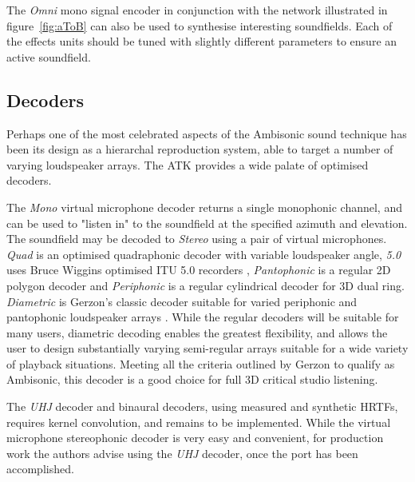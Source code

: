 \documentclass{article}
\begin{document}
The \emph{Omni} mono signal encoder in conjunction with the network illustrated in figure~\ref{fig:aToB} can also be used to synth\-esise interesting soundfields.
Each of the effects units should be tuned with slightly different parameters to ensure an active soundfield.





\subsection{Decoders}\label{sec:decoders}

Perhaps one of the most celebrated aspects of the Ambisonic sound technique has been its design as a hierarchal reproduction system, able to target a number of varying loudspeaker arrays.
The ATK provides a wide palate of optimised decoders.

The \emph{Mono} virtual microphone decoder returns a single monophonic channel, and can be used to "listen in" to the soundfield at the specified azimuth and elevation.
The soundfield may be decoded to \emph{Stereo} using a pair of virtual microphones.
\emph{Quad} is an optimised quadraphonic decoder with variable loudspeaker angle, \emph{5.0} uses Bruce Wiggins optimised ITU 5.0 recorders \cite{wiggins:2003optimised}, \emph{Pantophonic} is a regular 2D polygon decoder and \emph{Periphonic} is a regular cylindrical decoder for 3D dual ring.
\emph{Diametric} is Gerzon's classic decoder suitable for varied periphonic and pantophonic loudspeaker arrays \cite{gerzon:1980sphere}.
While the regular decoders will be suitable for many users, diametric decoding enables the greatest flexibility, and allows the user to design substantially varying semi-regular arrays suitable for a wide variety of playback situations.
Meeting all the criteria outlined by Gerzon to qualify as Ambisonic, this decoder is a good choice for full 3D critical studio listening.

The \emph{UHJ} decoder and binaural decoders, using measured and synthetic HRTFs, requires kernel convolution, and remains to be implemented.
While the virtual microphone stereophonic decoder is very easy and convenient, for production work the authors advise using the \emph{UHJ} decoder, once the port has been accomplished.
\end{document}
